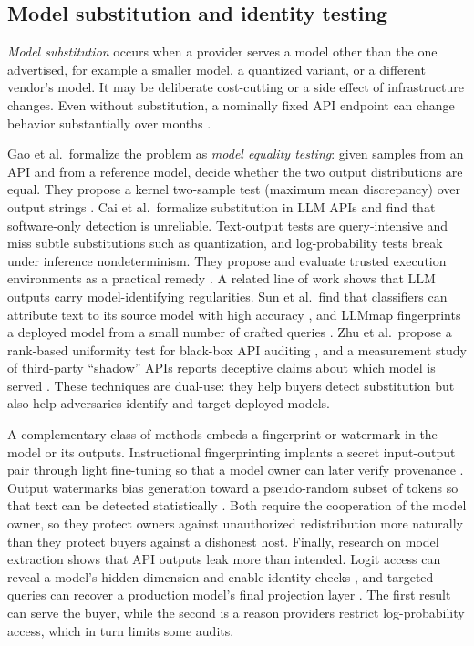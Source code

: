 \documentclass[sigconf]{acmart}
\begin{document}
\subsection{Model substitution and identity testing}\label{model-substitution-and-identity-testing}

\emph{Model substitution} occurs when a provider serves a model other than the one advertised, for example a smaller model, a quantized variant, or a different vendor's model. It may be deliberate cost-cutting or a side effect of infrastructure changes. Even without substitution, a nominally fixed API endpoint can change behavior substantially over months \cite{chen2024drift}.

Gao et al.~formalize the problem as \emph{model equality testing}: given samples from an API and from a reference model, decide whether the two output distributions are equal. They propose a kernel two-sample test (maximum mean discrepancy) over output strings \cite{gao2025equality}. Cai et al.~formalize substitution in LLM APIs and find that software-only detection is unreliable. Text-output tests are query-intensive and miss subtle substitutions such as quantization, and log-probability tests break under inference nondeterminism. They propose and evaluate trusted execution environments as a practical remedy \cite{cai2025substitution}. A related line of work shows that LLM outputs carry model-identifying regularities. Sun et al.~find that classifiers can attribute text to its source model with high accuracy \cite{sun2025idiosyncrasies}, and LLMmap fingerprints a deployed model from a small number of crafted queries \cite{pasquini2025llmmap}. Zhu et al.~propose a rank-based uniformity test for black-box API auditing \cite{zhu2025rut}, and a measurement study of third-party ``shadow'' APIs reports deceptive claims about which model is served \cite{zhang2026shadowapis}. These techniques are dual-use: they help buyers detect substitution but also help adversaries identify and target deployed models.

A complementary class of methods embeds a fingerprint or watermark in the model or its outputs. Instructional fingerprinting implants a secret input-output pair through light fine-tuning so that a model owner can later verify provenance \cite{xu2024instructional}. Output watermarks bias generation toward a pseudo-random subset of tokens so that text can be detected statistically \cite{kirchenbauer2023watermark}. Both require the cooperation of the model owner, so they protect owners against unauthorized redistribution more naturally than they protect buyers against a dishonest host. Finally, research on model extraction shows that API outputs leak more than intended. Logit access can reveal a model's hidden dimension and enable identity checks \cite{finlayson2024logits}, and targeted queries can recover a production model's final projection layer \cite{carlini2024stealing}. The first result can serve the buyer, while the second is a reason providers restrict log-probability access, which in turn limits some audits.
\end{document}
